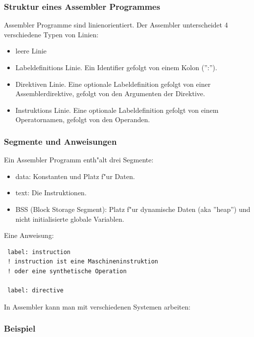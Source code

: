 \documentclass[german, 10pt, a4paper, twocolumn]{scrartcl}
\begin{document}
\subsubsection{Struktur eines Assembler Programmes}

Assembler Programme sind linienorientiert. Der Assembler unterscheidet 4 verschiedene Typen von Linien:
\begin{itemize}
	\item leere Linie
	\item Labeldefinitions Linie. Ein Identifier gefolgt von einem Kolon ('':'').
	\item Direktiven Linie. Eine optionale Labeldefinition gefolgt von einer Assemblerdirektive, gefolgt von den Argumenten der Direktive.
	\item Instruktions Linie. Eine optionale Labeldefinition gefolgt von einem Operatornamen, gefolgt von den Operanden.
\end{itemize}

\subsubsection{Segmente und Anweisungen}

Ein Assembler Programm enth"alt drei Segmente:
\begin{itemize}
	\item data: Konstanten und Platz f"ur Daten.
	\item text: Die Instruktionen.
	\item BSS (Block Storage Segment): Platz f"ur dynamische Daten (aka ''heap'') und nicht initialisierte globale Variablen.
\end{itemize}

Eine Anweisung:
\begin{verbatim}
 label: instruction
 ! instruction ist eine Maschineninstruktion
 ! oder eine synthetische Operation

 label: directive
\end{verbatim}

In Assembler kann man mit verschiedenen Systemen arbeiten:

\subsubsection{Beispiel}
\end{document}
